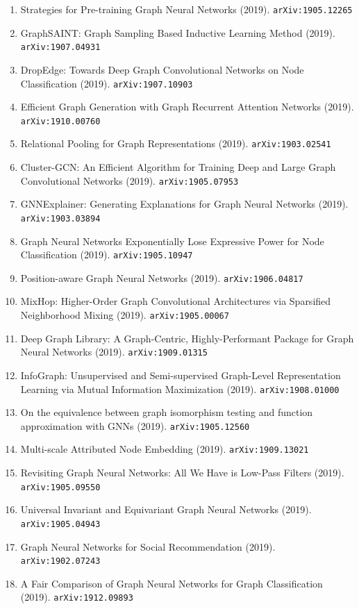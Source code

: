 \documentclass[11pt]{article}
\begin{document}
\begin{enumerate}
  \item Strategies for Pre-training Graph Neural Networks (2019). \texttt{arXiv:1905.12265}
  \item GraphSAINT: Graph Sampling Based Inductive Learning Method (2019). \texttt{arXiv:1907.04931}
  \item DropEdge: Towards Deep Graph Convolutional Networks on Node
  Classification (2019). \texttt{arXiv:1907.10903}
  \item Efficient Graph Generation with Graph Recurrent Attention Networks (2019). \texttt{arXiv:1910.00760}
  \item Relational Pooling for Graph Representations (2019). \texttt{arXiv:1903.02541}
  \item Cluster-GCN: An Efficient Algorithm for Training Deep and Large Graph
  Convolutional Networks (2019). \texttt{arXiv:1905.07953}
  \item GNNExplainer: Generating Explanations for Graph Neural Networks (2019). \texttt{arXiv:1903.03894}
  \item Graph Neural Networks Exponentially Lose Expressive Power for Node
  Classification (2019). \texttt{arXiv:1905.10947}
  \item Position-aware Graph Neural Networks (2019). \texttt{arXiv:1906.04817}
  \item MixHop: Higher-Order Graph Convolutional Architectures via Sparsified
  Neighborhood Mixing (2019). \texttt{arXiv:1905.00067}
  \item Deep Graph Library: A Graph-Centric, Highly-Performant Package for Graph
  Neural Networks (2019). \texttt{arXiv:1909.01315}
  \item InfoGraph: Unsupervised and Semi-supervised Graph-Level Representation
  Learning via Mutual Information Maximization (2019). \texttt{arXiv:1908.01000}
  \item On the equivalence between graph isomorphism testing and function
  approximation with GNNs (2019). \texttt{arXiv:1905.12560}
  \item Multi-scale Attributed Node Embedding (2019). \texttt{arXiv:1909.13021}
  \item Revisiting Graph Neural Networks: All We Have is Low-Pass Filters (2019). \texttt{arXiv:1905.09550}
  \item Universal Invariant and Equivariant Graph Neural Networks (2019). \texttt{arXiv:1905.04943}
  \item Graph Neural Networks for Social Recommendation (2019). \texttt{arXiv:1902.07243}
  \item A Fair Comparison of Graph Neural Networks for Graph Classification (2019). \texttt{arXiv:1912.09893}

\end{enumerate}
\end{document}
